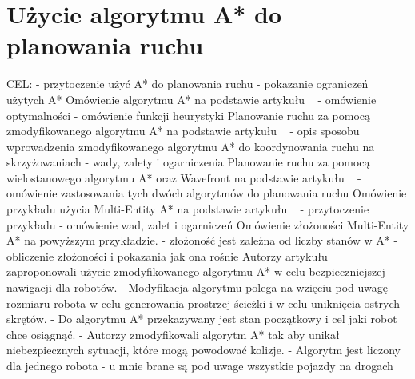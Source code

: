 \section{Użycie algorytmu A* do planowania ruchu}

CEL:
\newline
- przytoczenie użyć A* do planowania ruchu
\newline
- pokazanie ograniczeń użytych A*
\newline
\newline
Omówienie algorytmu A* na podstawie artykułu ~\cite{dechter1985generalized} 
  \newline
  - omówienie optymalności
  \newline
  - omówienie funkcji heurystyki
  \newline
\newline
Planowanie ruchu za pomocą zmodyfikowanego algorytmu A* na podstawie artykułu ~\cite{munteanmobile} 
  \newline
  - opis sposobu wprowadzenia zmodyfikowanego algorytmu A* do koordynowania ruchu na skrzyżowaniach
  \newline
  - wady, zalety i ogarniczenia
  \newline
  \newline
Planowanie ruchu za pomocą wielostanowego algorytmu A* oraz Wavefront na podstawie artykułu ~\cite{wojnicki2015robust} 
\newline
- omówienie zastosowania tych dwóch algorytmów do planowania ruchu
\newline
\newline
Omówienie przykładu użycia Multi-Entity A* na podstawie artykułu ~\cite{wojnicki2015robust} 
  \newline
  - przytoczenie przykładu
  \newline
  - omówienie wad, zalet i ogarniczeń
  \newline
  \newline
  Omówienie złożoności Multi-Entity A* na powyższym przykładzie.
  \newline
  - złożoność jest zależna od liczby stanów w A*
  \newline
  - obliczenie złożoności i pokazania jak ona rośnie
\newline
\newline
Autorzy artykułu ~\cite{elhalawany2013modified} zaproponowali użycie zmodyfikowanego algorytmu A* w celu bezpieczniejszej nawigacji dla robotów.
  \newline
  - Modyfikacja algorytmu polega na wzięciu pod uwagę rozmiaru robota w celu generowania prostrzej ścieżki i w celu uniknięcia ostrych skrętów.
  \newline
  - Do algorytmu A* przekazywany jest stan początkowy i cel jaki robot chce osiągnąć.
  \newline
  - Autorzy zmodyfikowali algorytm A* tak aby unikał niebezpiecznych sytuacji, które mogą powodować kolizje.
  \newline
  - Algorytm jest liczony dla jednego robota - u mnie brane są pod uwage wszystkie pojazdy na drogach
